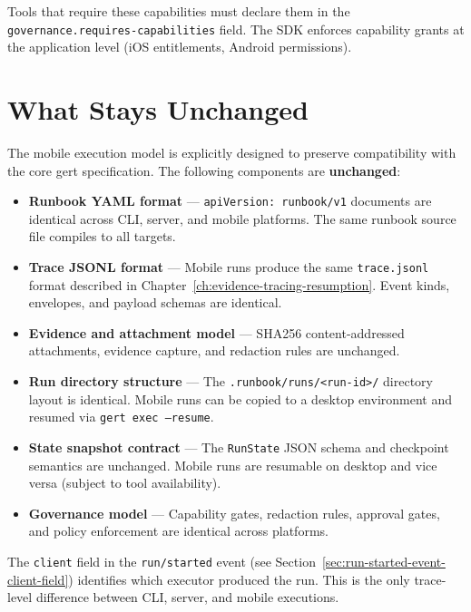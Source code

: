 Tools that require these capabilities must declare them in the \texttt{governance.requires-capabilities} field. The SDK enforces capability grants at the application level (iOS entitlements, Android permissions).

\section{What Stays Unchanged}

The mobile execution model is explicitly designed to preserve compatibility with the core gert specification. The following components are \textbf{unchanged}:

\begin{itemize}
  \item \textbf{Runbook YAML format} — \texttt{apiVersion: runbook/v1} documents are identical across CLI, server, and mobile platforms. The same runbook source file compiles to all targets.
  \item \textbf{Trace JSONL format} — Mobile runs produce the same \texttt{trace.jsonl} format described in Chapter~\ref{ch:evidence-tracing-resumption}. Event kinds, envelopes, and payload schemas are identical.
  \item \textbf{Evidence and attachment model} — SHA256 content-addressed attachments, evidence capture, and redaction rules are unchanged.
  \item \textbf{Run directory structure} — The \texttt{.runbook/runs/<run-id>/} directory layout is identical. Mobile runs can be copied to a desktop environment and resumed via \texttt{gert exec --resume}.
  \item \textbf{State snapshot contract} — The \texttt{RunState} JSON schema and checkpoint semantics are unchanged. Mobile runs are resumable on desktop and vice versa (subject to tool availability).
  \item \textbf{Governance model} — Capability gates, redaction rules, approval gates, and policy enforcement are identical across platforms.
\end{itemize}

The \texttt{client} field in the \texttt{run/started} event (see Section~\ref{sec:run-started-event-client-field}) identifies which executor produced the run. This is the only trace-level difference between CLI, server, and mobile executions.

